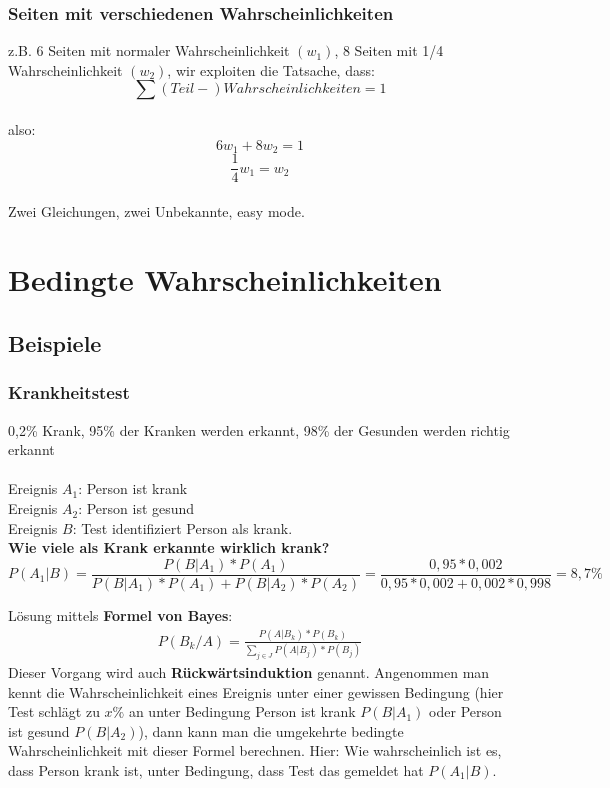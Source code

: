 \documentclass{article}
\begin{document}
\subsubsection{Seiten mit verschiedenen Wahrscheinlichkeiten}
z.B. 6 Seiten mit normaler Wahrscheinlichkeit $(w_1)$, 8 Seiten mit 1/4 Wahrscheinlichkeit
$(w_2)$, wir exploiten die Tatsache, dass: \\ \[ \sum
(Teil-)Wahrscheinlichkeiten = 1 \]\\
also:\\
\begin{equation}	
6w_1 + 8w_2 = 1 \end{equation}
\begin{equation}	
	\frac{1}{4}w_1 = w_2 
\end{equation}\\
Zwei Gleichungen, zwei Unbekannte, easy mode.

\section{Bedingte Wahrscheinlichkeiten}
\subsection{Beispiele}
\subsubsection{Krankheitstest}
0,2\% Krank, 95\% der Kranken werden erkannt, 98\% der Gesunden werden richtig erkannt\\ \\
Ereignis $A_1$: Person ist krank\\
Ereignis $A_2$: Person ist gesund\\
Ereignis $B$: Test identifiziert Person als krank.\\

\textbf{Wie viele als Krank erkannte wirklich krank?}\\
\[
	P(A_1 | B ) = \frac{P(B|A_1)*P(A_1)}
	{P(B|A_1)*P(A_1)+P(B| A_2)*P(A_2)} =
	\frac{0,95*0,002}{0,95*0,002+0,002*0,998} = 8,7\%
\]

\vspace*{10pt}

L\"osung mittels \textbf{Formel von Bayes}:
\begin{align}
	P(B_k/A) = \frac{P(A|B_k) * P(B_k)}{\sum_{j \in J} P(A|B_j) * P(B_j)}
\end{align}
Dieser Vorgang wird auch \textbf{R\"uckw\"artsinduktion} genannt. Angenommen man
kennt die Wahrscheinlichkeit eines Ereignis unter einer gewissen Bedingung (hier Test
schl\"agt zu $x\%$ an unter Bedingung Person ist krank $P(B|A_1)$ oder Person ist gesund
$P(B|A_2)$), dann kann man die umgekehrte bedingte Wahrscheinlichkeit
mit dieser Formel berechnen. Hier: Wie wahrscheinlich ist es, dass Person krank ist, unter
Bedingung, dass Test das gemeldet hat $P(A_1|B)$.
\end{document}
